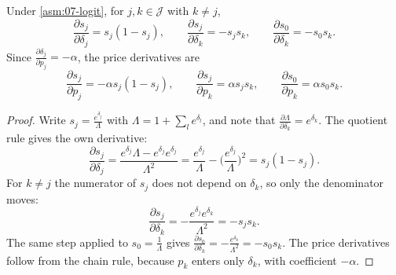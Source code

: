 \begin{proposition}\label{prop:07-logit-derivs}
Under \cref{asm:07-logit}, for $j, k \in \mathcal{J}$ with $k \ne j$,
\begin{equation}\label{eq:07-logit-derivs-delta}
  \frac{\partial s_j}{\partial \delta_j} = s_j(1 - s_j), \qquad
  \frac{\partial s_j}{\partial \delta_k} = -s_j s_k, \qquad
  \frac{\partial s_0}{\partial \delta_k} = -s_0 s_k .
\end{equation}
Since $\frac{\partial \delta_j}{\partial p_j} = -\alpha$, the price derivatives are
\begin{equation}\label{eq:07-logit-derivs-price}
  \frac{\partial s_j}{\partial p_j} = -\alpha s_j(1 - s_j), \qquad
  \frac{\partial s_j}{\partial p_k} = \alpha s_j s_k, \qquad
  \frac{\partial s_0}{\partial p_k} = \alpha s_0 s_k .
\end{equation}
\end{proposition}

\begin{proof}
Write $s_j = \frac{e^{\delta_j}}{\Lambda}$ with $\Lambda = 1 + \sum_l e^{\delta_l}$, and note that
$\frac{\partial \Lambda}{\partial \delta_k} = e^{\delta_k}$. The quotient rule gives the own derivative:
\begin{equation*}
  \frac{\partial s_j}{\partial \delta_j}
  = \frac{e^{\delta_j}\Lambda - e^{\delta_j}e^{\delta_j}}{\Lambda^2}
  = \frac{e^{\delta_j}}{\Lambda} - \Big(\frac{e^{\delta_j}}{\Lambda}\Big)^2
  = s_j(1 - s_j).
\end{equation*}
For $k \ne j$ the numerator of $s_j$ does not depend on $\delta_k$, so only the denominator moves:
\begin{equation*}
  \frac{\partial s_j}{\partial \delta_k} = -\frac{e^{\delta_j}e^{\delta_k}}{\Lambda^2} = -s_j s_k .
\end{equation*}
The same step applied to $s_0 = \frac{1}{\Lambda}$ gives $\frac{\partial s_0}{\partial \delta_k} =
-\frac{e^{\delta_k}}{\Lambda^2} = -s_0 s_k$. The price derivatives follow from the chain rule, because $p_k$
enters only $\delta_k$, with coefficient $-\alpha$.
\end{proof}

